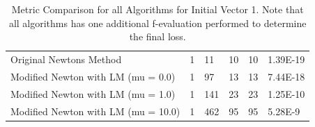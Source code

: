 \documentclass{article}
\begin{document}
\begin{table}[H]
\begin{tabular}{@{}llllll@{}}
    Original Newtons Method             & 1      & 11    & 10 & 10 & 1.39E-19 \\
    Modified Newton with LM (mu = 0.0)  & 1      & 97    & 13 & 13 & 7.44E-18 \\
    Modified Newton with LM (mu = 1.0)  & 1      & 141   & 23 & 23 & 1.25E-10 \\
    Modified Newton with LM (mu = 10.0) & 1      & 462   & 95 & 95 & 5.28E-9  \\ \bottomrule
    \end{tabular}
    \caption{Metric Comparison for all Algorithms for Initial Vector 1. Note that all algorithms has one additional f-evaluation performed to determine the final loss.}    
    \label{tab:concludingmetrics}
    \end{table}

    \begin{table}[H]
    \centering
\end{table}
\end{document}
